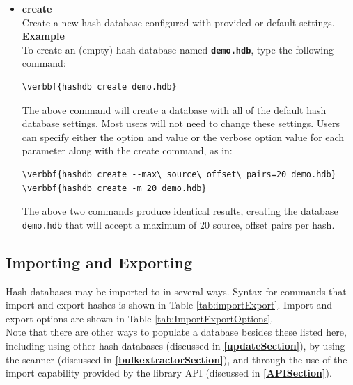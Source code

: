 \documentclass[11pt,fleqn]{article} %
\begin{document}
\begin{itemize}
\item \textbf{create}\\
Create a new hash database configured with provided or default settings.\\

\textbf{Example}\\
To create an (empty) hash database named \textbf{\texttt{demo.hdb}}, type the following command:
\begin{Verbatim}[commandchars=\\\{\}]
\verbbf{hashdb create demo.hdb}
\end{Verbatim}
The above command will create a database with all of the default hash database settings. Most users will not need to change these settings.
Users can specify either the option and value or the verbose option value for each parameter along with the create command, as in:\\
\begin{Verbatim}[commandchars=\\\{\}]
\verbbf{hashdb create --max\_source\_offset\_pairs=20 demo.hdb}
\verbbf{hashdb create -m 20 demo.hdb}
\end{Verbatim}
The above two commands produce identical results, creating the database \texttt{demo.hdb} that will accept a maximum of 20 source, offset pairs per hash.\\
\end{itemize}

\subsection{Importing and Exporting}
Hash databases may be imported to in several ways.  Syntax for commands that import and export hashes is shown in Table \ref{tab:importExport}. Import and export options are shown in Table \ref{tab:ImportExportOptions}.\\

Note that there are other ways to populate a database besides these listed here, including using other hash databases (discussed in \textbf{\autoref{updateSection}}),
by using the \bulk \hdb scanner (discussed in \textbf{\autoref{bulkextractorSection}}),
and through the use of the import capability provided by the \hdb library API (discussed in \textbf{\autoref{APISection}}).\\
\end{document}
